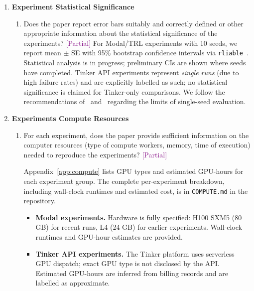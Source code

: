 \documentclass{article}
\newcommand{\answerPartial}[1][]{\textcolor{purple}{[Partial] #1}}
\begin{document}
\begin{enumerate}
\item {\bf Experiment Statistical Significance}
    \begin{enumerate}
        \item Does the paper report error bars suitably and correctly
              defined or other appropriate information about the statistical
              significance of the experiments?
        \answerPartial{For Modal/TRL experiments with 10 seeds, we report
        mean $\pm$ SE with 95\% bootstrap confidence intervals via
        \texttt{rliable}~\cite{agarwal2021deep}.  Statistical analysis is
        in progress; preliminary CIs are shown where seeds have completed.
        Tinker API experiments represent \emph{single runs} (due to high
        failure rates) and are explicitly labelled as such; no statistical
        significance is claimed for Tinker-only comparisons.  We follow the
        recommendations of~\citet{colas2019hitchhiker}
        and~\citet{jordan2024benchmarking} regarding the limits of
        single-seed evaluation.}
    \end{enumerate}

\item {\bf Experiments Compute Resources}
    \begin{enumerate}
        \item For each experiment, does the paper provide sufficient
              information on the computer resources (type of compute
              workers, memory, time of execution) needed to reproduce the
              experiments?
        \answerPartial{Appendix~\ref{app:compute} lists GPU types and
        estimated GPU-hours for each experiment group.  The complete
        per-experiment breakdown, including wall-clock runtimes and
        estimated cost, is in \texttt{COMPUTE.md} in the repository.
        \begin{itemize}
          \item \textbf{Modal experiments.}  Hardware is fully specified:
                H100 SXM5 (80 GB) for recent runs, L4 (24 GB) for earlier
                experiments.  Wall-clock runtimes and GPU-hour estimates are
                provided.
          \item \textbf{Tinker API experiments.}  The Tinker platform uses
                serverless GPU dispatch; exact GPU type is not disclosed by
                the API.  Estimated GPU-hours are inferred from billing
                records and are labelled as approximate.
        \end{itemize}}
    \end{enumerate}


\end{enumerate}
\end{document}
